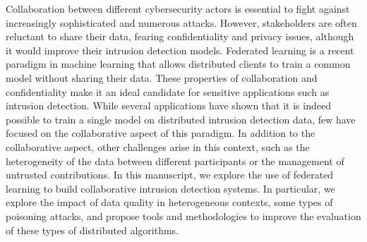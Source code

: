 Collaboration between different cybersecurity actors is essential to fight against increasingly sophisticated and numerous attacks.
However, stakeholders are often reluctant to share their data, fearing confidentiality and privacy issues, although it would improve their intrusion detection models.
Federated learning is a recent paradigm in machine learning that allows distributed clients to train a common model without sharing their data.
These properties of collaboration and confidentiality make it an ideal candidate for sensitive applications such as intrusion detection.
While several applications have shown that it is indeed possible to train a single model on distributed intrusion detection data, few have focused on the collaborative aspect of this paradigm.
In addition to the collaborative aspect, other challenges arise in this context, such as the heterogeneity of the data between different participants or the management of untrusted contributions.
%
In this manuscript, we explore the use of federated learning to build collaborative intrusion detection systems.
In particular, we explore the impact of data quality in heterogeneous contexts, some types of poisoning attacks, and propose tools and methodologies to improve the evaluation of these types of distributed algorithms.